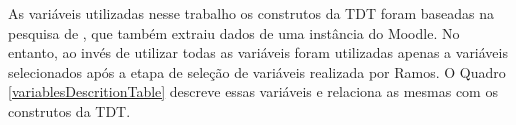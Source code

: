 
As variáveis utilizadas nesse trabalho os construtos da TDT foram baseadas na
pesquisa de , que também extraiu dados de uma
instância do Moodle. No entanto, ao invés de utilizar todas as variáveis foram
utilizadas apenas a variáveis selecionados após a etapa de seleção de variáveis
realizada por Ramos. O Quadro \ref{variablesDescritionTable} descreve essas
variáveis e relaciona as mesmas com os construtos da TDT.

